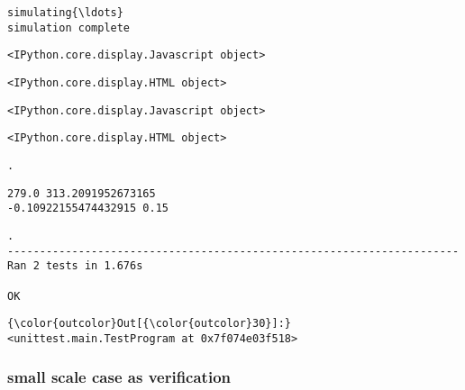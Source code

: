 \documentclass[11pt]{article}
\begin{document}
    \begin{Verbatim}[commandchars=\\\{\}]
simulating{\ldots}
simulation complete

    \end{Verbatim}

    
    \begin{verbatim}
<IPython.core.display.Javascript object>
    \end{verbatim}

    
    
    \begin{verbatim}
<IPython.core.display.HTML object>
    \end{verbatim}

    
    
    \begin{verbatim}
<IPython.core.display.Javascript object>
    \end{verbatim}

    
    
    \begin{verbatim}
<IPython.core.display.HTML object>
    \end{verbatim}

    
    \begin{Verbatim}[commandchars=\\\{\}]
.
    \end{Verbatim}

    \begin{Verbatim}[commandchars=\\\{\}]
279.0 313.2091952673165
-0.10922155474432915 0.15

    \end{Verbatim}

    \begin{Verbatim}[commandchars=\\\{\}]
.
----------------------------------------------------------------------
Ran 2 tests in 1.676s

OK

    \end{Verbatim}

\begin{Verbatim}[commandchars=\\\{\}]
{\color{outcolor}Out[{\color{outcolor}30}]:} <unittest.main.TestProgram at 0x7f074e03f518>
\end{Verbatim}
            
    \hypertarget{small-scale-case-as-verification}{%
\subsubsection{small scale case as
verification}\label{small-scale-case-as-verification}}
\end{document}
